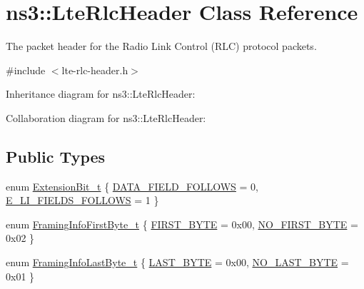 \hypertarget{classns3_1_1LteRlcHeader}{}\section{ns3\+:\+:Lte\+Rlc\+Header Class Reference}
\label{classns3_1_1LteRlcHeader}


The packet header for the Radio Link Control (R\+LC) protocol packets.  




{\ttfamily \#include $<$lte-\/rlc-\/header.\+h$>$}



Inheritance diagram for ns3\+:\+:Lte\+Rlc\+Header\+:


Collaboration diagram for ns3\+:\+:Lte\+Rlc\+Header\+:
\subsection*{Public Types}
\begin{DoxyCompactItemize}
\item 
enum \hyperlink{classns3_1_1LteRlcHeader_a48248337dcddd6c1f6f79b75b898266a}{Extension\+Bit\+\_\+t} \{ \hyperlink{classns3_1_1LteRlcHeader_a48248337dcddd6c1f6f79b75b898266aa244934a97b8fe6ca2786896ca48f04dd}{D\+A\+T\+A\+\_\+\+F\+I\+E\+L\+D\+\_\+\+F\+O\+L\+L\+O\+WS} = 0, 
\hyperlink{classns3_1_1LteRlcHeader_a48248337dcddd6c1f6f79b75b898266aac938d14a69d34c1fbea6822591cfe9de}{E\+\_\+\+L\+I\+\_\+\+F\+I\+E\+L\+D\+S\+\_\+\+F\+O\+L\+L\+O\+WS} = 1
 \}
\item 
enum \hyperlink{classns3_1_1LteRlcHeader_a9bfac53b015df1fd1fe649764534b0de}{Framing\+Info\+First\+Byte\+\_\+t} \{ \hyperlink{classns3_1_1LteRlcHeader_a9bfac53b015df1fd1fe649764534b0deaa3a14c19603556ac2ead7440fd6d54ba}{F\+I\+R\+S\+T\+\_\+\+B\+Y\+TE} = 0x00, 
\hyperlink{classns3_1_1LteRlcHeader_a9bfac53b015df1fd1fe649764534b0dea610c4bd2a31d4896f4bb1d08cb96dfbb}{N\+O\+\_\+\+F\+I\+R\+S\+T\+\_\+\+B\+Y\+TE} = 0x02
 \}
\item 
enum \hyperlink{classns3_1_1LteRlcHeader_abf2c6056d7e9ebe1872e2243e5fc65aa}{Framing\+Info\+Last\+Byte\+\_\+t} \{ \hyperlink{classns3_1_1LteRlcHeader_abf2c6056d7e9ebe1872e2243e5fc65aaa0cb019a1055c009eb8c8ff34f796cb89}{L\+A\+S\+T\+\_\+\+B\+Y\+TE} = 0x00, 
\hyperlink{classns3_1_1LteRlcHeader_abf2c6056d7e9ebe1872e2243e5fc65aaac36f5c572c5ab51ef1652c5d4e4c9e7d}{N\+O\+\_\+\+L\+A\+S\+T\+\_\+\+B\+Y\+TE} = 0x01
 \}
\end{DoxyCompactItemize}
